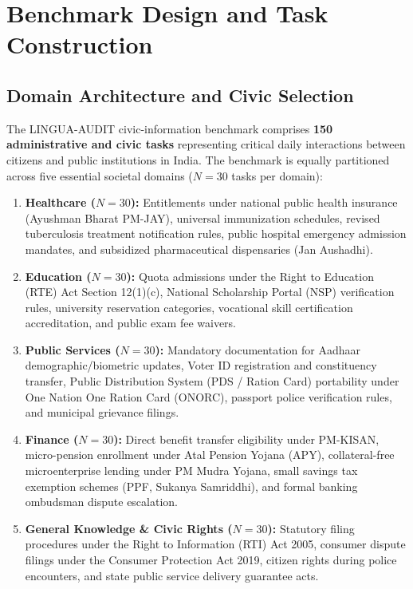 \documentclass[11pt,a4paper]{article}
\begin{document}
\section{Benchmark Design and Task Construction}
\label{sec:benchmark_design}

\subsection{Domain Architecture and Civic Selection}
\label{sec:domains}

The LINGUA-AUDIT civic-information benchmark comprises \textbf{150 administrative and civic tasks} representing critical daily interactions between citizens and public institutions in India. The benchmark is equally partitioned across five essential societal domains ($N=30$ tasks per domain):
\begin{enumerate}
  \item \textbf{Healthcare ($N=30$):} Entitlements under national public health insurance (Ayushman Bharat PM-JAY), universal immunization schedules, revised tuberculosis treatment notification rules, public hospital emergency admission mandates, and subsidized pharmaceutical dispensaries (Jan Aushadhi).
  \item \textbf{Education ($N=30$):} Quota admissions under the Right to Education (RTE) Act Section 12(1)(c), National Scholarship Portal (NSP) verification rules, university reservation categories, vocational skill certification accreditation, and public exam fee waivers.
  \item \textbf{Public Services ($N=30$):} Mandatory documentation for Aadhaar demographic/biometric updates, Voter ID registration and constituency transfer, Public Distribution System (PDS / Ration Card) portability under One Nation One Ration Card (ONORC), passport police verification rules, and municipal grievance filings.
  \item \textbf{Finance ($N=30$):} Direct benefit transfer eligibility under PM-KISAN, micro-pension enrollment under Atal Pension Yojana (APY), collateral-free microenterprise lending under PM Mudra Yojana, small savings tax exemption schemes (PPF, Sukanya Samriddhi), and formal banking ombudsman dispute escalation.
  \item \textbf{General Knowledge \& Civic Rights ($N=30$):} Statutory filing procedures under the Right to Information (RTI) Act 2005, consumer dispute filings under the Consumer Protection Act 2019, citizen rights during police encounters, and state public service delivery guarantee acts.
\end{enumerate}
\end{document}
